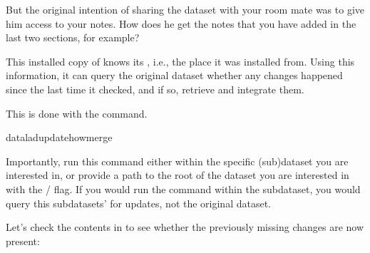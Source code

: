 \sphinxAtStartPar
But the original intention of sharing the dataset with
your room mate was to give him access to your notes.
How does he get the notes that you have added in the last
two sections, for example?

\sphinxAtStartPar
This installed copy of  knows its , i.e.,
the place it was installed from. Using this information,
it can query the original dataset whether any changes
happened since the last time it checked, and if so, retrieve and
integrate them.

\ignorespaces 
\sphinxAtStartPar
This is done with the 
command.

\begin{sphinxVerbatim}[commandchars=\\\{\}]
dataladupdate\PYGZhy{}\PYGZhy{}howmerge
\end{sphinxVerbatim}

\sphinxAtStartPar
Importantly, run this command either within the specific
(sub)dataset you are interested in, or provide a path to
the root of the dataset you are interested in with the
/ flag. If you would run the command
within the  subdataset, you would query this
subdatasets’  for updates, not the original
 dataset.

\sphinxAtStartPar
Let’s check the contents in  to see whether
the previously missing changes are now present:

